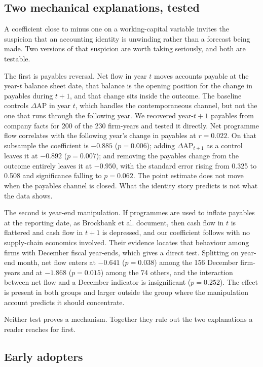 \documentclass[conference,a4paper]{IEEEtran}
\begin{document}
\subsection{Two mechanical explanations, tested}

A coefficient close to minus one on a working-capital variable invites the
suspicion that an accounting identity is unwinding rather than a forecast being
made. Two versions of that suspicion are worth taking seriously, and both are
testable.

The first is payables reversal. Net flow in year $t$ moves accounts payable at
the year-$t$ balance sheet date, that balance is the opening position for the
change in payables during $t+1$, and that change sits inside the outcome. The
baseline controls $\Delta$AP in year $t$, which handles the contemporaneous
channel, but not the one that runs through the following year. We recovered
year-$t{+}1$ payables from company facts for 200 of the 230 firm-years and tested
it directly. Net programme flow correlates with the following year's change in
payables at $r = 0.022$. On that subsample the coefficient is $-0.885$
($p = 0.006$); adding $\Delta$AP$_{t+1}$ as a control leaves it at $-0.892$
($p = 0.007$); and removing the payables change from the outcome entirely leaves
it at $-0.950$, with the standard error rising from 0.325 to 0.508 and
significance falling to $p = 0.062$. The point estimate does not move when the
payables channel is closed. What the identity story predicts is not what the
data shows.

The second is year-end manipulation. If programmes are used to inflate payables
at the reporting date, as Brockbank et al. \cite{brockbank2025} document, then
cash flow in $t$ is flattered and cash flow in $t+1$ is depressed, and our
coefficient follows with no supply-chain economics involved. Their evidence
locates that behaviour among firms with December fiscal year-ends, which gives a
direct test. Splitting on year-end month, net flow enters at $-0.641$
($p = 0.038$) among the 156 December firm-years and at $-1.868$ ($p = 0.015$)
among the 74 others, and the interaction between net flow and a December
indicator is insignificant ($p = 0.252$). The effect is present in both groups
and larger outside the group where the manipulation account predicts it should
concentrate.

Neither test proves a mechanism. Together they rule out the two explanations a
reader reaches for first.

\subsection{Early adopters}
\end{document}
